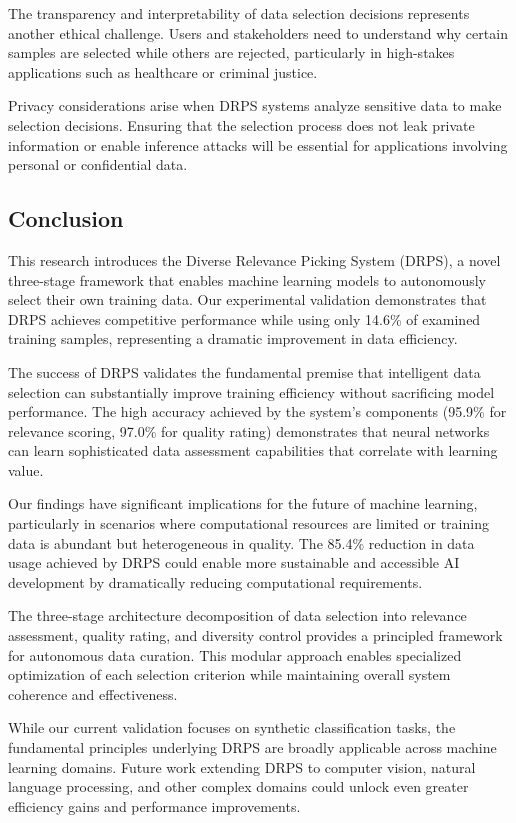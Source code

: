 \documentclass[12pt]{article}
\begin{document}
The transparency and interpretability of data selection decisions represents another ethical challenge. Users and stakeholders need to understand why certain samples are selected while others are rejected, particularly in high-stakes applications such as healthcare or criminal justice.

Privacy considerations arise when DRPS systems analyze sensitive data to make selection decisions. Ensuring that the selection process does not leak private information or enable inference attacks will be essential for applications involving personal or confidential data.

\subsection{Conclusion}\label{conclusion}

This research introduces the Diverse Relevance Picking System (DRPS), a novel three-stage framework that enables machine learning models to autonomously select their own training data. Our experimental validation demonstrates that DRPS achieves competitive performance while using only 14.6\% of examined training samples, representing a dramatic improvement in data efficiency.

The success of DRPS validates the fundamental premise that intelligent data selection can substantially improve training efficiency without sacrificing model performance. The high accuracy achieved by the system's components (95.9\% for relevance scoring, 97.0\% for quality rating) demonstrates that neural networks can learn sophisticated data assessment capabilities that correlate with learning value.

Our findings have significant implications for the future of machine learning, particularly in scenarios where computational resources are limited or training data is abundant but heterogeneous in quality. The 85.4\% reduction in data usage achieved by DRPS could enable more sustainable and accessible AI development by dramatically reducing computational requirements.

The three-stage architecture decomposition of data selection into relevance assessment, quality rating, and diversity control provides a principled framework for autonomous data curation. This modular approach enables specialized optimization of each selection criterion while maintaining overall system coherence and effectiveness.

While our current validation focuses on synthetic classification tasks, the fundamental principles underlying DRPS are broadly applicable across machine learning domains. Future work extending DRPS to computer vision, natural language processing, and other complex domains could unlock even greater efficiency gains and performance improvements.
\end{document}
